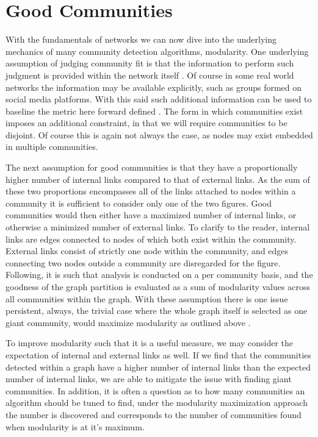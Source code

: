 \documentclass[a4paper, 12pt, twocolumn]{article}
\begin{document}
\section{Good Communities}

With the fundamentals of networks we can now dive into the underlying mechanics of many community detection algorithms, modularity.
One underlying assumption of judging community fit is that the information to perform such judgment is provided within the network itself \cite{network_science}.
Of course in some real world networks the information may be available explicitly, such as groups formed on social media platforms.
With this said such additional information can be used to baseline the metric here forward defined \cite{finding_and_evaling_comm_struct}.
The form in which communities exist imposes an additional constraint, in that we will require communities to be disjoint.
Of course this is again not always the case, as nodes may exist embedded in multiple communities.

The next assumption for good communities is that they have a proportionally higher number of internal links compared to that of external links.
As the sum of these two proportions encompasses all of the links attached to nodes within a community it is sufficient to consider only one of the two figures.
Good communities would then either have a maximized number of internal links, or otherwise a minimized number of external links.
To clarify to the reader, internal links are edges connected to nodes of which both exist within the community.
External links consist of strictly one node within the community, and edges connecting two nodes outside a community are disregarded for the figure.
Following, it is such that analysis is conducted on a per community basis, and the goodness of the graph partition is evaluated as a sum of modularity values across all communities within the graph.
With these assumption there is one issue persistent, always, the trivial case where the whole graph itself is selected as one giant community, would maximize modularity as outlined above \cite{finding_comm_struct}.

To improve modularity such that it is a useful measure, we may consider the expectation of internal and external links as well.
If we find that the communities detected within a graph have a higher number of internal links than the expected number of internal links, we are able to mitigate the issue with finding giant communities.
In addition, it is often a question as to how many communities an algorithm should be tuned to find, under the modularity maximization approach the number is discovered and corresponds to the number of communities found when modularity is at it's maximum.
\end{document}
